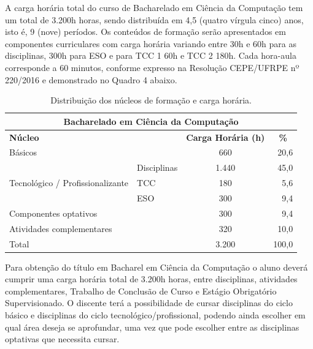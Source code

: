 A carga horária total do curso de Bacharelado em Ciência da Computação tem um total de 3.200h horas, sendo distribuída em 4,5 (quatro vírgula cinco) anos, isto é, 9 (nove) períodos. Os conteúdos de formação serão apresentados em componentes curriculares com carga horária variando entre 30h e 60h para as disciplinas, 300h para ESO e para TCC 1 60h e TCC 2 180h. Cada hora-aula corresponde a 60 minutos, conforme expresso na Resolução CEPE/UFRPE nº 220/2016 e demonstrado no Quadro 4 abaixo.

\begin{center}
  
  \begin{scriptsize}
    \begin{longtable}{p{4cm}p{1.5cm}p{2cm}p{3cm}}
      \caption{\label{quadro:distribuicao-nucleos-formacao-e-ch}Distribuição dos núcleos de formação e carga horária.}\\
    \toprule
    \multicolumn{4}{c}{\textbf{Bacharelado em Ciência da Computação}}\\ \midrule
    \multicolumn{2}{l}{\textbf{Núcleo}} & \multicolumn{1}{c}{\textbf{Carga Horária (h)}} & \multicolumn{1}{c}{\textbf{\%}}\\
    \midrule
    Básicos & & \multicolumn{1}{c}{660} & \multicolumn{1}{r}{20,6}\\ \midrule
    \multirow{3}{3cm}{Tecnológico / Profissionalizante} & Disciplinas & \multicolumn{1}{c}{1.440} & \multicolumn{1}{r}{45,0}\\ \cline{2-4}
    & TCC & \multicolumn{1}{c}{180} & \multicolumn{1}{r}{5,6}\\ \cline{2-4}
    & ESO & \multicolumn{1}{c}{300} & \multicolumn{1}{r}{9,4}\\ \midrule
    \multicolumn{2}{l}{Componentes optativos} & \multicolumn{1}{c}{300} & \multicolumn{1}{r}{9,4}\\ \midrule
    \multicolumn{2}{l}{Atividades complementares} & \multicolumn{1}{c}{320} & \multicolumn{1}{r}{10,0}\\ \midrule
    \multicolumn{2}{l}{Total} & \multicolumn{1}{c}{3.200} & \multicolumn{1}{r}{100,0}\\
\bottomrule
\end{longtable}
\end{scriptsize}      
\end{center}

Para obtenção do título em Bacharel em Ciência da Computação o aluno deverá cumprir uma carga horária total de 3.200h horas, entre disciplinas, atividades complementares, Trabalho de Conclusão de Curso e Estágio Obrigatório Supervisionado. O discente terá a possibilidade de cursar disciplinas do ciclo básico e disciplinas do ciclo tecnológico/profissional, podendo ainda escolher em qual área deseja se aprofundar, uma vez que pode escolher entre as disciplinas optativas que necessita cursar.

